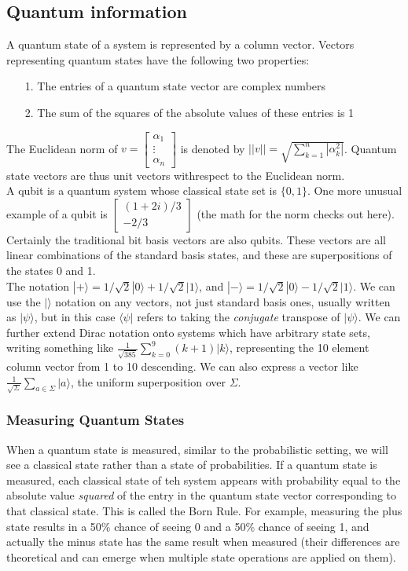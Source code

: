 \documentclass{amsart}
\begin{document}
\subsection*{Quantum information}
A quantum state of a system is represented by a column vector. Vectors representing quantum
states have the following two properties:
\begin{itemize}
\item[1.] The entries of a quantum state vector are complex numbers
\item[2.] The sum of the squares of the absolute values of these entries is 1
\end{itemize}
The Euclidean norm of $ v = \begin{bmatrix} \alpha_1 \\ \vdots \\ \alpha_n \end{bmatrix} $ is
denoted by $ ||v|| = \sqrt{\sum_{k=1}^n |\alpha_k^2|} $. Quantum state vectors are thus unit
vectors withrespect to the Euclidean norm. \\
A qubit is a quantum system whose classical state set is $ \{0,1\} $. One more unusual example
of a qubit is $ \begin{bmatrix} (1 + 2i)/3 \\ -2/3 \end{bmatrix} $ (the math for the norm
checks out here). Certainly the traditional bit basis vectors are also qubits. These vectors
are all linear combinations of the standard basis states, and these are superpositions of the
states 0 and 1. \\
The notation $ |+\rangle = 1/\sqrt{2}|0\rangle + 1/\sqrt{2} |1\rangle $, and
$ |-\rangle = 1/\sqrt{2} |0\rangle - 1/\sqrt{2} |1 \rangle $. We can use the $ | \rangle $
notation on any vectors, not just standard basis ones, usually written as
$ | \psi \rangle $, but in this case $ \langle \psi | $ refers to taking the \emph{conjugate}
transpose of $ | \psi \rangle $. We can further extend Dirac notation onto systems which have
arbitrary state sets, writing something like $ \frac{1}{\sqrt{385}} \sum_{k=0}^9(k+1)|k\rangle
$, representing the 10 element column vector from 1 to 10 descending. We can also express a
vector like $ \frac{1}{\sqrt{\Sigma}} \sum_{a \in \Sigma} |a\rangle $, the uniform
superposition over $ \Sigma $.
\subsubsection*{Measuring Quantum States}
When a quantum state is measured, similar to the probabilistic setting, we will see a
classical state rather than a state of probabilities. If a quantum state is measured, each
classical state of teh system appears with probability equal to the absolute value
\emph{squared} of the entry in the quantum state vector corresponding to that classical state.
This is called the Born Rule. For example, measuring the plus state results in a 50\% chance
of seeing 0 and a 50\% chance of seeing 1, and actually the minus state has the same result
when measured (their differences are theoretical and can emerge when multiple state operations
are applied on them).
\end{document}
